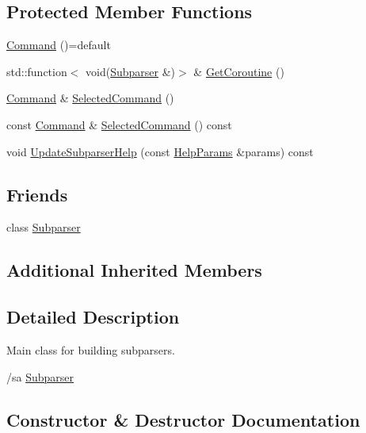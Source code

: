 \subsection*{Protected Member Functions}
\begin{DoxyCompactItemize}
\item 
\hyperlink{classargs_1_1_command_a58f55910e9746d4af64512f8e6fc6007}{Command} ()=default
\item 
std\+::function$<$ void(\hyperlink{classargs_1_1_subparser}{Subparser} \&)$>$ \& \hyperlink{classargs_1_1_command_ac026b5eeed24051bea59ff41350863d0}{Get\+Coroutine} ()
\item 
\hyperlink{classargs_1_1_command}{Command} \& \hyperlink{classargs_1_1_command_a09a64666c38476ee923b0cb7a0f56215}{Selected\+Command} ()
\item 
const \hyperlink{classargs_1_1_command}{Command} \& \hyperlink{classargs_1_1_command_af806e6bf21282670984d1ef4680d393b}{Selected\+Command} () const
\item 
void \hyperlink{classargs_1_1_command_a93c6c07576c78fabd319d8d0b872c5b1}{Update\+Subparser\+Help} (const \hyperlink{structargs_1_1_help_params}{Help\+Params} \&params) const
\end{DoxyCompactItemize}
\subsection*{Friends}
\begin{DoxyCompactItemize}
\item 
class \hyperlink{classargs_1_1_command_aecbd7c0572cb2d7fecb5eff79552c203}{Subparser}
\end{DoxyCompactItemize}
\subsection*{Additional Inherited Members}


\subsection{Detailed Description}
Main class for building subparsers.

/sa \hyperlink{classargs_1_1_subparser}{Subparser} 

\subsection{Constructor \& Destructor Documentation}
\mbox{\label{classargs_1_1_command_a58f55910e9746d4af64512f8e6fc6007}} 
